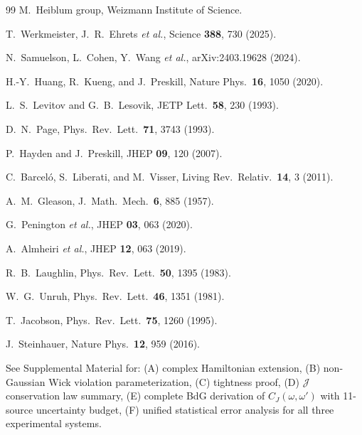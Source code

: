 \documentclass[aps,prd,reprint,superscriptaddress,twocolumn]{revtex4-2}
\begin{document}
\begin{thebibliography}{99}
 M.~Heiblum group, Weizmann Institute of Science.

 T.~Werkmeister, J.~R.~Ehrets \textit{et al.}, Science \textbf{388}, 730 (2025).

 N.~Samuelson, L.~Cohen, Y.~Wang \textit{et al.}, arXiv:2403.19628 (2024).

 H.-Y.~Huang, R.~Kueng, and J.~Preskill, Nature Phys.~\textbf{16}, 1050 (2020).

 L.~S.~Levitov and G.~B.~Lesovik, JETP Lett.~\textbf{58}, 230 (1993).

 D.~N.~Page, Phys.~Rev.~Lett.~\textbf{71}, 3743 (1993).

 P.~Hayden and J.~Preskill, JHEP \textbf{09}, 120 (2007).

 C.~Barcel\'{o}, S.~Liberati, and M.~Visser, Living Rev.~Relativ.~\textbf{14}, 3 (2011).

 A.~M.~Gleason, J.~Math.~Mech.~\textbf{6}, 885 (1957).

 G.~Penington \textit{et al.}, JHEP \textbf{03}, 063 (2020).

 A.~Almheiri \textit{et al.}, JHEP \textbf{12}, 063 (2019).

 R.~B.~Laughlin, Phys.~Rev.~Lett.~\textbf{50}, 1395 (1983).

 W.~G.~Unruh, Phys.~Rev.~Lett.~\textbf{46}, 1351 (1981).

 T.~Jacobson, Phys.~Rev.~Lett.~\textbf{75}, 1260 (1995).

 J.~Steinhauer, Nature Phys.~\textbf{12}, 959 (2016).

 See Supplemental Material for: (A) complex Hamiltonian extension, (B) non-Gaussian Wick violation parameterization, (C) tightness proof, (D) $\mathcal{J}$ conservation law summary, (E) complete BdG derivation of $C_J(\omega,\omega')$ with 11-source uncertainty budget, (F) unified statistical error analysis for all three experimental systems.

\end{thebibliography}
\end{document}
